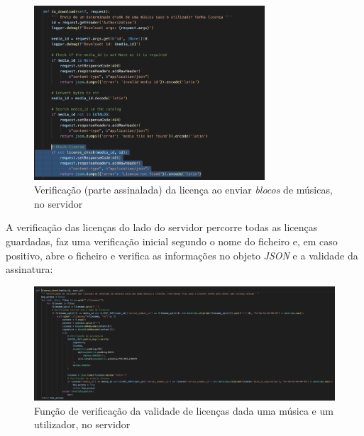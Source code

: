 \documentclass[10pt,english]{article}
\begin{document}
\begin{figure}[!h]
        \centering
        \includegraphics[width=325]{images/do_download_license.png}
        \caption{Verificação (parte assinalada) da licença ao enviar \textit{blocos} de músicas, no servidor}
\end{figure}

\clearpage

\par A verificação das licenças do lado do servidor percorre todas as licenças guardadas, faz uma verificação inicial segundo o nome do ficheiro e, em caso positivo, abre o ficheiro e verifica as informações no objeto \textit{JSON} e a validade da assinatura:

\begin{figure}[!h]
        \centering
        \includegraphics[width=\textwidth]{images/check_license_server.png}
        \caption{Função de verificação da validade de licenças dada uma música e um utilizador, no servidor}
\end{figure}


\clearpage
\end{document}
